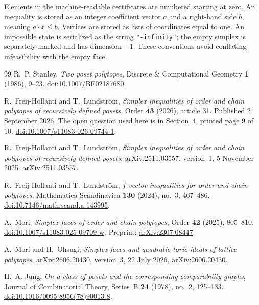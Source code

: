 \documentclass[11pt]{article}
\theoremstyle{definition}
\begin{document}
Elements in the machine-readable certificates are numbered starting at zero. An inequality is stored as an integer coefficient vector $a$ and a right-hand side $b$, meaning $a\cdot x\le b$. Vertices are stored as lists of coordinates equal to one. An impossible state is serialized as the string \texttt{"-infinity"}; the empty simplex is separately marked and has dimension $-1$. These conventions avoid conflating infeasibility with the empty face.

\begin{thebibliography}{99}
R.~P. Stanley, \emph{Two poset polytopes}, Discrete \& Computational Geometry \textbf{1} (1986), 9--23.
\href{https://doi.org/10.1007/BF02187680}{doi:10.1007/BF02187680}.

R.~Freij-Hollanti and T.~Lundstr\"om, \emph{Simplex inequalities of order and chain polytopes of recursively defined posets}, Order \textbf{43} (2026), article 31. Published 2 September 2026. The open question used here is in Section~4, printed page 9 of 10.
\href{https://doi.org/10.1007/s11083-026-09744-1}{doi:10.1007/s11083-026-09744-1}.

R.~Freij-Hollanti and T.~Lundstr\"om, \emph{Simplex inequalities of order and chain polytopes of recursively defined posets}, arXiv:2511.03557, version~1, 5 November 2025.
\href{https://arxiv.org/abs/2511.03557}{arXiv:2511.03557}.

R.~Freij-Hollanti and T.~Lundstr\"om, \emph{$f$-vector inequalities for order and chain polytopes}, Mathematica Scandinavica \textbf{130} (2024), no.~3, 467--486.
\href{https://doi.org/10.7146/math.scand.a-143995}{doi:10.7146/math.scand.a-143995}.

A.~Mori, \emph{Simplex faces of order and chain polytopes}, Order \textbf{42} (2025), 805--810.
\href{https://doi.org/10.1007/s11083-025-09709-w}{doi:10.1007/s11083-025-09709-w}.
Preprint: \href{https://arxiv.org/abs/2307.08447}{arXiv:2307.08447}.

A.~Mori and H.~Ohsugi, \emph{Simplex faces and quadratic toric ideals of lattice polytopes}, arXiv:2606.20430, version~3, 22 July 2026.
\href{https://arxiv.org/abs/2606.20430}{arXiv:2606.20430}.

H.~A. Jung, \emph{On a class of posets and the corresponding comparability graphs}, Journal of Combinatorial Theory, Series~B \textbf{24} (1978), no.~2, 125--133.
\href{https://doi.org/10.1016/0095-8956(78)90013-8}{doi:10.1016/0095-8956(78)90013-8}.
\end{thebibliography}
\end{document}
